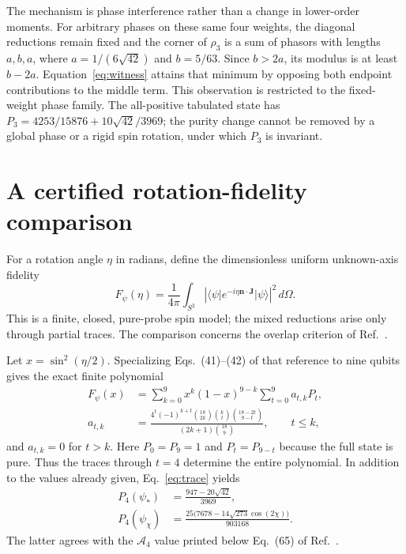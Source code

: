 \documentclass[aps,pra,reprint,onecolumn,notitlepage,longbibliography]{revtex4-2}
\newcommand{\ket}[1]{\lvert #1\rangle}
\newcommand{\bra}[1]{\langle #1\rvert}
\newcommand{\A}{\mathcal A}
\begin{document}
The mechanism is phase interference rather than a change in lower-order moments. For arbitrary phases on these same four weights, the diagonal reductions remain fixed and the corner of $\rho_3$ is a sum of phasors with lengths $a,b,a$, where $a=1/(6\sqrt{42})$ and $b=5/63$. Since $b>2a$, its modulus is at least $b-2a$. Equation~\eqref{eq:witness} attains that minimum by opposing both endpoint contributions to the middle term. This observation is restricted to the fixed-weight phase family. The all-positive tabulated state has $P_3=4253/15876+10\sqrt{42}/3969$; the purity change cannot be removed by a global phase or a rigid spin rotation, under which $P_3$ is invariant.

\section{A certified rotation-fidelity comparison}
For a rotation angle $\eta$ in radians, define the dimensionless uniform unknown-axis fidelity
\begin{equation}
 F_\psi(\eta)=\frac1{4\pi}\int_{S^2}
 \left|\bra\psi e^{-i\eta\bm n\cdot\bm J}\ket\psi\right|^2\,d\Omega.
 \label{eq:fidelity}
\end{equation}
This is a finite, closed, pure-probe spin model; the mixed reductions arise only through partial traces. The comparison concerns the overlap criterion of Ref.~\cite{Martin2020}.

Let $x=\sin^2(\eta/2)$. Specializing Eqs.~(41)--(42) of that reference to nine qubits gives the exact finite polynomial
\begin{align}
 F_\psi(x)&=\sum_{k=0}^9x^k(1-x)^{9-k}
              \sum_{t=0}^9a_{t,k}P_t,
              \label{eq:fullpoly}\\
 a_{t,k}&=\frac{4^t(-1)^{k+t}\binom{18}{2k}\binom kt
                     \binom{18-2t}{9-t}}
                     {(2k+1)\binom{18}9},\qquad t\leq k,
              \label{eq:coeff}
\end{align}
and $a_{t,k}=0$ for $t>k$. Here $P_0=P_9=1$ and $P_t=P_{9-t}$ because the full state is pure. Thus the traces through $t=4$ determine the entire polynomial. In addition to the values already given, Eq.~\eqref{eq:trace} yields
\begin{align}
 P_4(\psi_*)&=\frac{947-20\sqrt{42}}{3969},
                    \label{eq:p4w}\\
 P_4(\psi_\chi)&=\frac{25\bigl(7678-14\sqrt{273}\cos(2\chi)\bigr)}{903168}.
                    \label{eq:p4b}
\end{align}
The latter agrees with the $\A_4$ value printed below Eq.~(65) of Ref.~\cite{Martin2020}.
\end{document}
